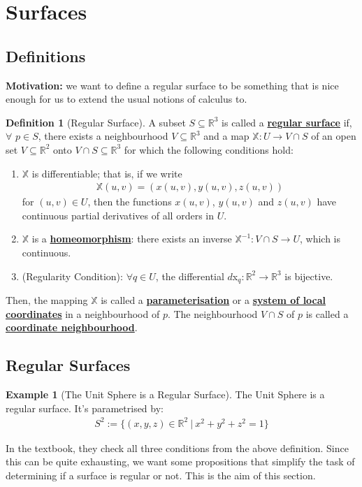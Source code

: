 \documentclass[11pt]{scrartcl}
\newcommand{\R}[0]{\mathbb{R}}
\theoremstyle{definition}
\newtheorem{definition}{Definition}
\newtheorem{ex}{Example}
\theoremstyle{remark}
\newcommand{\dfn}[1]{\textbf{\underline{#1}}}
\begin{document}
{\section{Surfaces}

\subsection{Definitions}

\textbf{Motivation:} we want to define a regular surface to be something that is nice enough for us to extend the usual notions of calculus to. 


\begin{definition}[Regular Surface]
	A subset $S \subseteq \R^3$ is called a \dfn{regular surface} if, $\forall$ $p \in S$, there exists a neighbourhood $V \subseteq \R^3$ and a map $\mathbb{X}: U \rightarrow V \cap S$ of an open set $V \subseteq \R^2$ onto $V \cap S \subseteq \R^3$ for which the following conditions hold: 
	\begin{enumerate}[noitemsep]
		\item $\mathbb{X}$ is differentiable; that is, if we write 
		\begin{align*}
			\mathbb{X}(u,v) = (x(u,v), y(u,v), z(u,v)) 
		\end{align*} 
		for $(u,v) \in U$, then the functions $x(u,v)$, $y(u,v)$ and $z(u,v)$ have continuous partial derivatives of all orders in $U$. 
		\item $\mathbb{X}$ is a \dfn{homeomorphism}: there exists an inverse $\mathbb{X}^{-1}: V \cap S \rightarrow U$, which is continuous. 
		\item (Regularity Condition): $\forall q \in U$, the differential $d$x$_q: \R^2 \rightarrow \R^3$ is bijective. 
	\end{enumerate}
	Then, the mapping $\mathbb{X}$ is called a \dfn{parameterisation}  or a \dfn{system of local coordinates} in a neighbourhood of $p$. The neighbourhood $V \cap S$ of $p$ is called a \dfn{coordinate neighbourhood}. 
\end{definition}


\subsection{Regular Surfaces}
\begin{ex}[The Unit Sphere is a Regular Surface] 
	The Unit Sphere is a regular surface. It's parametrised by: 
	\begin{align*}
		S^2 := \{ (x,y,z) \in \R^2\ |\ x^2 + y^2 + z^2 = 1 \} 
	\end{align*}
\end{ex}
In the textbook, they check all three conditions from the above definition. Since this can be quite exhausting, we want some propositions that simplify the task of determining if a surface is regular or not. This is the aim of this section. 

}
\end{document}
